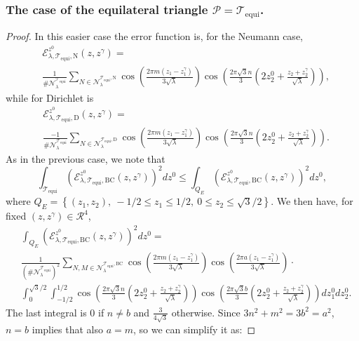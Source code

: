 \documentclass{amsart}
\theoremstyle{definition}
\theoremstyle{remark}
\renewcommand\leq\leqslant
\numberwithin{equation}{section}
\theoremstyle{definition}
\theoremstyle{remark}
\begin{document}
\subsubsection{The case of the equilateral triangle $\mathcal{P}=	\mathcal{T}_\mathrm{equi}$.}
\begin{proof}
	In this easier case the error function is, for the Neumann case,	\begin{equation}
		\begin{aligned}
			&\mathcal{E}_{\lambda,\mathcal{T}_\mathrm{equi},\mathrm{N}}^{z^0}(z,z^\gamma)
			=\\&\frac{1}{\#\mathcal{N}_\lambda^{\mathcal{T}_\mathrm{equi}}}\sum_{N\in\mathcal{N}_\lambda^{\mathcal{T}_\mathrm{equi},\mathrm{N}}}\cos\left(\frac{2\pi m\left(z_1-z_1^\gamma\right)}{3\sqrt{\lambda}}\right)\cos\left(\frac{2\pi\sqrt{3}n}{3}\left(2z_2^0+\frac{z_2+z_2^\gamma}{\sqrt{\lambda}}\right)\right),
		\end{aligned}
	\end{equation} while for Dirichlet is
	\begin{equation}
		\begin{aligned}
			&\mathcal{E}_{\lambda,\mathcal{T}_\mathrm{equi},\mathrm{D}}^{z^0}(z,z^\gamma)
			=\\&\frac{-1}{\#\mathcal{N}_\lambda^{\mathcal{T}_\mathrm{equi}}}\sum_{N\in\mathcal{N}_\lambda^{\mathcal{T}_\mathrm{equi},\mathrm{D}}}\cos\left(\frac{2\pi m\left(z_1-z_1^\gamma\right)}{3\sqrt{\lambda}}\right)\cos\left(\frac{2\pi\sqrt{3}n}{3}\left(2z_2^0+\frac{z_2+z_2^\gamma}{\sqrt{\lambda}}\right)\right).
		\end{aligned}
	\end{equation} 
	As in the previous case, we note that \begin{equation}
		\int_{	\mathcal{T}_\mathrm{equi}}\left(\mathcal{E}_{\lambda,\mathcal{T}_\mathrm{equi},\mathrm{BC}}^{z^0}(z,z^\gamma)\right)^2dz^0\leq \int_{Q_E}\left(\mathcal{E}_{\lambda,\mathcal{T}_\mathrm{equi},\mathrm{BC}}^{z^0}(z,z^\gamma)\right)^2dz^0,
	\end{equation}where $Q_E=\left\{(z_1,z_2),\ -1/2\leq z_1\leq 1/2,\ 0\leq z_2\leq \sqrt{3}/2\right\}$. We then have, for fixed $(z,z^\gamma)\in\mathcal{R}^4$, 
	\begin{equation}
		\begin{aligned}
			&\int_{Q_E}\left(\mathcal{E}_{\lambda,\mathcal{T}_\mathrm{equi},\mathrm{BC}}^{z^0}(z,z^\gamma)\right)^2dz^0=\\&\frac{1}{\left(\#\mathcal{N}_\lambda^{\mathcal{T}_\mathrm{equi}}\right)^2}\sum_{N,M\in\mathcal{N}_\lambda^{\mathcal{T}_\mathrm{equi},\mathrm{BC}}}\cos\left(\frac{2\pi m\left(z_1-z_1^\gamma\right)}{3\sqrt{\lambda}}\right)\cos\left(\frac{2\pi a\left(z_1-z_1^\gamma\right)}{3\sqrt{\lambda}}\right)\cdot\\&\int_0^{\sqrt{3}/2}\int_{-1/2}^{1/2}\cos\left(\frac{2\pi\sqrt{3}n}{3}\left(2z_2^0+\frac{z_2+z_2^\gamma}{\sqrt{\lambda}}\right)\right)\cos\left(\frac{2\pi\sqrt{3}b}{3}\left(2z_2^0+\frac{z_2+z_2^\gamma}{\sqrt{\lambda}}\right)\right)dz_1^0dz_2^0.\end{aligned}\end{equation}The last integral is $0$ if $n\neq b$ and $\frac{3}{4\sqrt{3}}$ otherwise. Since $3n^2+m^2=3b^2=a^2$, $n=b$ implies that also $a=m$, so we can simplify it as: 

\end{proof}
\end{document}
